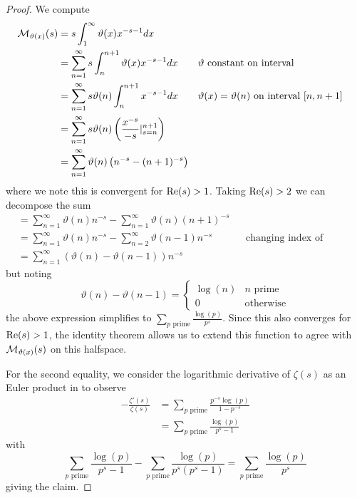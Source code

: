 \begin{proof}
    We compute 
    \begin{align*}
        \mathcal{M}_{\vartheta(x)}(s)&=s\int_{1}^{\infty}\vartheta(x)x^{-s-1}dx \\
        &= \sum_{n=1}^{\infty}s\int_{n}^{n+1}\vartheta(x)x^{-s-1}dx && \vartheta\text{ constant on interval}\\
        &= \sum_{n=1}^{\infty}s\vartheta(n)\int_{n}^{n+1}x^{-s-1}dx && \vartheta(x)=\vartheta(n)\text{ on interval }[n,n+1] \\
        &= \sum_{n=1}^{\infty}s\vartheta(n)\left(\frac{x^{-s}}{-s}|_{s=n}^{n+1}\right) \\
        &= \sum_{n=1}^{\infty}\vartheta(n)\left(n^{-s}-(n+1)^{-s}\right)
    \end{align*}
    where we note this is convergent for $\mathrm{Re}(s)>1$. Taking $\mathrm{Re}(s)>2$ we can decompose the sum 
    \begin{align*}
        &=\sum_{n=1}^{\infty}\vartheta(n)n^{-s} - \sum_{n=1}^{\infty}\vartheta(n)(n+1)^{-s} \\ 
        &=\sum_{n=1}^{\infty}\vartheta(n)n^{-s} - \sum_{n=2}^{\infty}\vartheta(n-1)n^{-s} && \text{changing index of summation in 2nd sum} \\
        &= \sum_{n=1}^{\infty}(\vartheta(n)-\vartheta(n-1))n^{-s}
    \end{align*}
    but noting
    $$\vartheta(n)-\vartheta(n-1)=\begin{cases}
        \log(n) & n \text{ prime}\\
        0 & \text{otherwise}
    \end{cases}$$
    the above expression simplifies to $\sum_{p\text{ prime}}\frac{\log(p)}{p^{s}}$. Since this also converges for $\mathrm{Re}(s)>1$, the identity theorem  allows us to extend this function to agree with $\mathcal{M}_{\vartheta(x)}(s)$ on this halfspace. 
    
    For the second equality, we consider the logarithmic derivative of $\zeta(s)$ as an Euler product in  to observe 
    \begin{align*}
        -\frac{\zeta'(s)}{\zeta(s)} &= \sum_{p\text{ prime}}\frac{p^{-s}\log(p)}{1-p^{-s}} \\
        &= \sum_{p\text{ prime}}\frac{\log(p)}{p^{s}-1}
    \end{align*}
    with 
    $$\sum_{p\text{ prime}}\frac{\log(p)}{p^{s}-1}-\sum_{p\text{ prime}}\frac{\log(p)}{p^{s}(p^{s}-1)}=\sum_{p\text{ prime}}\frac{\log(p)}{p^{s}}$$
    giving the claim. 
\end{proof}
